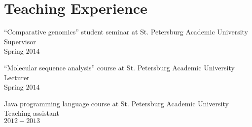 \blankline

\section{Teaching Experience}
``Comparative genomics'' student seminar at St. Petersburg Academic University\\
Supervisor\\
Spring $2014$

\blankline

``Molecular sequence analysis'' course at St. Petersburg Academic University\\
Lecturer\\
Spring $2014$

\blankline

Java programming language course at St. Petersburg Academic University\\
Teaching assistant\\ 
$2012-2013$



